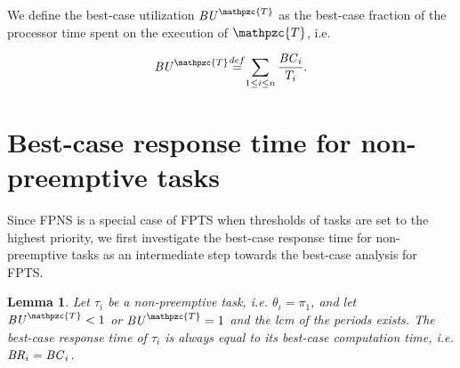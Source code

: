 \documentclass[conference,compsoc]{IEEEtran}
\newcommand\defeq{\stackrel{\mathclap{\tiny\mbox{def}}}{=}}
\newtheorem{lemma}{Lemma}
\newcommand{\bc}    {\mbox{\it BC}}
\newcommand{\br}    {\mbox{\it BR}}
\newcommand{\bu}    {\mbox{\it BU}}
\begin{document}
We define the best-case utilization $\bu^{\mathpzc{T}}$ as the best-case fraction of the  processor time spent on the execution of $\mathpzc{T}$, i.e.

%
\begin{align}
\bu^{\mathpzc{T}} \defeq \sum_{1\leq i \leq n} \frac{\bc_i}{T_i}.
\end{align} 

\section{Best-case response time for non-preemptive tasks}
Since FPNS is a special case of FPTS when thresholds of tasks are set to the highest priority, we first investigate the best-case response time for non-preemptive tasks as an intermediate step towards the best-case analysis for FPTS.

\begin{lemma}
	\textit{Let $\tau_i$ be a non-preemptive task, i.e. $\theta_i = \pi_1$, and let $\bu^{\mathpzc{T}}<1$ or $\bu^{\mathpzc{T}}=1$ and the lcm of the periods exists. The \textit{best-case response time} of $\tau_i$ is always equal to its \textit{best-case computation time}, i.e. $\br_i = \bc_i$.}
\end{lemma}
\end{document}
